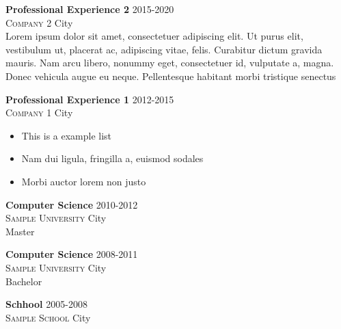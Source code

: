 \begin{body}
    \begin{experience}%
        \begin{cvItem}
            \textbf{Professional Experience 2} \hfill 2015-2020\\
            \textsc{Company 2} City\\
            Lorem ipsum dolor sit amet, consectetuer adipiscing elit. Ut purus elit, vestibulum ut, placerat ac,
            adipiscing vitae, felis. Curabitur dictum gravida mauris. Nam arcu libero, nonummy eget, consectetuer
            id, vulputate a, magna. Donec vehicula augue eu neque. Pellentesque habitant morbi tristique senectus
        \end{cvItem}
        \begin{cvItem}
            \textbf{Professional Experience 1} \hfill 2012-2015\\
            \textsc{Company 1} City
            \begin{itemize}[leftmargin=*]
                \item This is a example list
                \item Nam dui ligula, fringilla a, euismod sodales
                \item  Morbi auctor lorem non justo
            \end{itemize}
        \end{cvItem}
    \end{experience}

    \begin{education}%
        \begin{cvItem}
            \textbf{Computer Science} \hfill 2010-2012\\
            \textsc{Sample University} City\\
            Master
        \end{cvItem}

        \begin{cvItem}
            \textbf{Computer Science} \hfill 2008-2011\\
            \textsc{Sample University} City\\
            Bachelor
        \end{cvItem}

        \begin{cvItem}
            \textbf{Schhool} \hfill 2005-2008\\
            \textsc{Sample School} City\\
        \end{cvItem}


\end{education}
\end{body}
